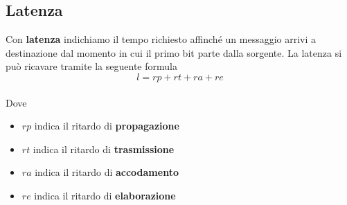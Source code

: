 \subsection{Latenza}
Con \textbf{latenza} indichiamo il tempo richiesto affinché un messaggio arrivi a destinazione dal
momento in cui il primo bit parte dalla sorgente. La latenza si può ricavare tramite la seguente 
formula
\[ l = rp + rt + ra + re \]
\\ Dove
\begin{itemize}
	\item $rp$ indica il ritardo di \textbf{propagazione}
	\item $rt$ indica il ritardo di \textbf{trasmissione}
	\item $ra$ indica il ritardo di \textbf{accodamento}
	\item $re$ indica il ritardo di \textbf{elaborazione}
\end{itemize}

